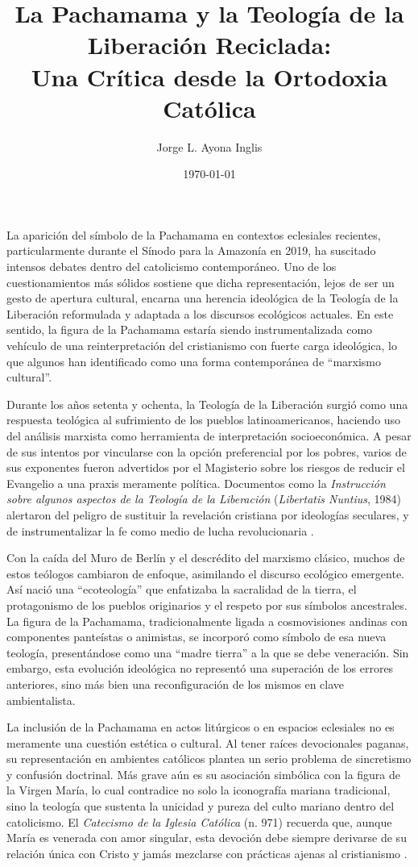 \documentclass[12pt]{article}
\title{La Pachamama y la Teología de la Liberación Reciclada:\\Una Crítica desde la Ortodoxia Católica}
\author{Jorge L. Ayona Inglis}
\date{\today}
\begin{document}
\maketitle
\onehalfspacing

\noindent
La aparición del símbolo de la Pachamama en contextos eclesiales recientes, particularmente durante el Sínodo para la Amazonía en 2019, ha suscitado intensos debates dentro del catolicismo contemporáneo. Uno de los cuestionamientos más sólidos sostiene que dicha representación, lejos de ser un gesto de apertura cultural, encarna una herencia ideológica de la Teología de la Liberación reformulada y adaptada a los discursos ecológicos actuales. En este sentido, la figura de la Pachamama estaría siendo instrumentalizada como vehículo de una reinterpretación del cristianismo con fuerte carga ideológica, lo que algunos han identificado como una forma contemporánea de “marxismo cultural”.

Durante los años setenta y ochenta, la Teología de la Liberación surgió como una respuesta teológica al sufrimiento de los pueblos latinoamericanos, haciendo uso del análisis marxista como herramienta de interpretación socioeconómica. A pesar de sus intentos por vincularse con la opción preferencial por los pobres, varios de sus exponentes fueron advertidos por el Magisterio sobre los riesgos de reducir el Evangelio a una praxis meramente política. Documentos como la \textit{Instrucción sobre algunos aspectos de la Teología de la Liberación} (\textit{Libertatis Nuntius}, 1984) alertaron del peligro de sustituir la revelación cristiana por ideologías seculares, y de instrumentalizar la fe como medio de lucha revolucionaria \cite{libertatis}.

Con la caída del Muro de Berlín y el descrédito del marxismo clásico, muchos de estos teólogos cambiaron de enfoque, asimilando el discurso ecológico emergente. Así nació una “ecoteología” que enfatizaba la sacralidad de la tierra, el protagonismo de los pueblos originarios y el respeto por sus símbolos ancestrales. La figura de la Pachamama, tradicionalmente ligada a cosmovisiones andinas con componentes panteístas o animistas, se incorporó como símbolo de esa nueva teología, presentándose como una “madre tierra” a la que se debe veneración. Sin embargo, esta evolución ideológica no representó una superación de los errores anteriores, sino más bien una reconfiguración de los mismos en clave ambientalista.

La inclusión de la Pachamama en actos litúrgicos o en espacios eclesiales no es meramente una cuestión estética o cultural. Al tener raíces devocionales paganas, su representación en ambientes católicos plantea un serio problema de sincretismo y confusión doctrinal. Más grave aún es su asociación simbólica con la figura de la Virgen María, lo cual contradice no solo la iconografía mariana tradicional, sino la teología que sustenta la unicidad y pureza del culto mariano dentro del catolicismo. El \textit{Catecismo de la Iglesia Católica} (n. 971) recuerda que, aunque María es venerada con amor singular, esta devoción debe siempre derivarse de su relación única con Cristo y jamás mezclarse con prácticas ajenas al cristianismo \cite{catecismo}.
\end{document}

